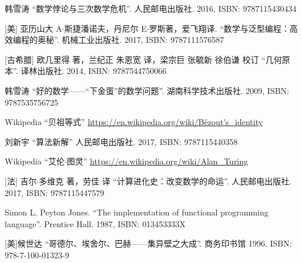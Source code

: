 \documentclass{article}
\begin{document}
\ifx\wholebook\relax \else
\begin{thebibliography}{99}

韩雪涛 ``数学悖论与三次数学危机''. 人民邮电出版社. 2016, ISBN: 9787115430434

[美] 亚历山大 A$\cdot$斯捷潘诺夫，丹尼尔 E$\cdot$罗斯著，爱飞翔译. ``数学与泛型编程：高效编程的奥秘''. 机械工业出版社. 2017, ISBN: 9787111576587

[古希腊] 欧几里得 著，兰纪正 朱恩宽 译，梁宗巨 张毓新 徐伯谦 校订 ``几何原本''. 译林出版社. 2014, ISBN: 9787544750066

韩雪涛 ``好的数学——“下金蛋”的数学问题''. 湖南科学技术出版社. 2009, ISBN: 9787535756725

Wikipedia ``贝祖等式'' \url{https://en.wikipedia.org/wiki/Bézout's_identity}

刘新宇 ``算法新解'' 人民邮电出版社. 2017, ISBN: 9787115440358

Wikipedia ``艾伦$\cdot$图灵'' \url{https://en.wikipedia.org/wiki/Alan_Turing}

[法] 吉尔$\cdot$多维克 著，劳佳 译 ``计算进化史：改变数学的命运''. 人民邮电出版社. 2017, ISBN: 9787115447579

Simon L. Peyton Jones. ``The implementation of functional programming language''. Prentice Hall. 1987, ISBN: 013453333X

[美]候世达 ``哥德尔、埃舍尔、巴赫——集异壁之大成''. 商务印书馆 1996. ISBN: 978-7-100-01323-9

\end{thebibliography}

\expandafter\enddocument

\fi
\end{document}
